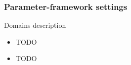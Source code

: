 \begin{frame}
    \frametitle{Parameter-framework settings}
    \begin{minipage}{0.40\textwidth}
    \begin{block}{Domains description}
        \begin{itemize}
            \item TODO
            \item TODO
        \end{itemize}
    \end{block}
    \end{minipage}
    \begin{minipage}{0.53\textwidth}
        
    \end{minipage}
\end{frame}
